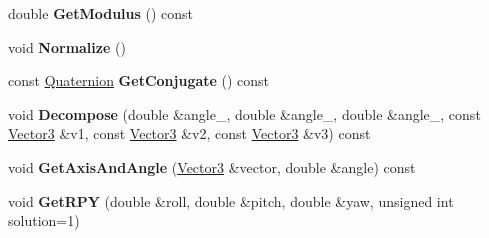 \begin{DoxyCompactItemize}
\item 
\hypertarget{classdfv_1_1Quaternion_a53cd2807386dfc3d7c30965ba88479cd}{double {\bfseries \-Get\-Modulus} () const }\label{classdfv_1_1Quaternion_a53cd2807386dfc3d7c30965ba88479cd}

\item 
\hypertarget{classdfv_1_1Quaternion_ab478a458a056202c520db6035181f35a}{void {\bfseries \-Normalize} ()}\label{classdfv_1_1Quaternion_ab478a458a056202c520db6035181f35a}

\item 
\hypertarget{classdfv_1_1Quaternion_ad73be69491ecc3bdbaf99a60381286ef}{const \hyperlink{classdfv_1_1Quaternion}{\-Quaternion} {\bfseries \-Get\-Conjugate} () const }\label{classdfv_1_1Quaternion_ad73be69491ecc3bdbaf99a60381286ef}

\item 
\hypertarget{classdfv_1_1Quaternion_a87d164e589fe07e388c8d9db61429135}{void {\bfseries \-Decompose} (double \&angle\-\_, double \&angle\-\_, double \&angle\-\_, const \hyperlink{classdfv_1_1Vector3}{\-Vector3} \&v1, const \hyperlink{classdfv_1_1Vector3}{\-Vector3} \&v2, const \hyperlink{classdfv_1_1Vector3}{\-Vector3} \&v3) const }\label{classdfv_1_1Quaternion_a87d164e589fe07e388c8d9db61429135}

\item 
\hypertarget{classdfv_1_1Quaternion_aa6c98b6045a48aaa647ab9e38fd700ec}{void {\bfseries \-Get\-Axis\-And\-Angle} (\hyperlink{classdfv_1_1Vector3}{\-Vector3} \&vector, double \&angle) const }\label{classdfv_1_1Quaternion_aa6c98b6045a48aaa647ab9e38fd700ec}

\item 
\hypertarget{classdfv_1_1Quaternion_a11bdb85deac862cd3b2df553cdcd0bf4}{void {\bfseries \-Get\-R\-P\-Y} (double \&roll, double \&pitch, double \&yaw, unsigned int solution=1)}\label{classdfv_1_1Quaternion_a11bdb85deac862cd3b2df553cdcd0bf4}

\end{DoxyCompactItemize}
